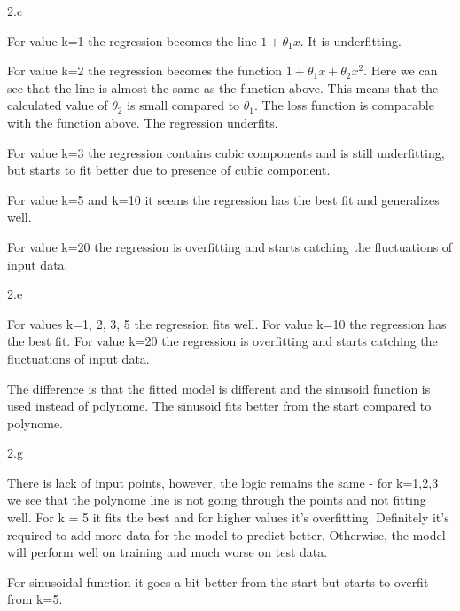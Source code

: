 \LARGE
2.c
\normalsize

\begin{answer}
  For value k=1 the regression becomes the line $1 + \theta_1 x$. It is underfitting.
  
  For value k=2 the regression becomes the function $1 + \theta_1 x + \theta_2 x^2$. Here we can see that the line is almost the same as the function above. This means that the calculated value of $\theta_2$ is small compared to $\theta_1$. The loss function is comparable with the function above. The regression underfits.

  For value k=3 the regression contains cubic components and is still underfitting, but starts to fit better due to presence of cubic component.

  For value k=5 and k=10 it seems the regression has the best fit and generalizes well.

  For value k=20 the regression is overfitting and starts catching the fluctuations of input data.
\end{answer}
\clearpage

\LARGE
2.e
\normalsize

\begin{answer}
  For values k=1, 2, 3, 5 the regression fits well.
  For value k=10 the regression has the best fit.
  For value k=20 the regression is overfitting and starts catching the fluctuations of input data.

  The difference is that the fitted model is different and the sinusoid function is used instead of polynome. The sinusoid fits better from the start compared to polynome.
\end{answer}
\clearpage

\LARGE
2.g
\normalsize

\begin{answer}
  There is lack of input points, however, the logic remains the same - for k=1,2,3 we see that the polynome line is not going through the points and not fitting well. For k = 5 it fits the best and for higher values it's overfitting. Definitely it's required to add more data for the model to predict better. Otherwise, the model will perform well on training and much worse on test data.

  For sinusoidal function it goes a bit better from the start but starts to overfit from k=5.
\end{answer}
\clearpage

